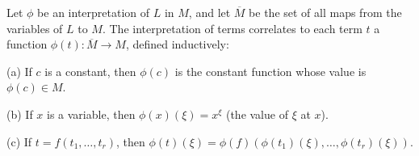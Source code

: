 Let $\phi$ be an interpretation of $L$ in $M$, and let $\overline{M}$ be the set of all maps from the variables of $L$ to $M$. The interpretation of terms correlates to each term $t$ a function $\phi(t) : \overline{M} \to M$, defined inductively:

(a) If $c$ is a constant, then $\phi(c)$ is the constant function whose value is $\phi(c) \in M$.

(b) If $x$ is a variable, then $\phi(x)(\xi) = x^\xi$ (the value of $\xi$ at $x$).

(c) If $t = f(t_1, \ldots, t_r)$, then $\phi(t)(\xi) = \phi(f)(\phi(t_1)(\xi), \ldots, \phi(t_r)(\xi))$.
